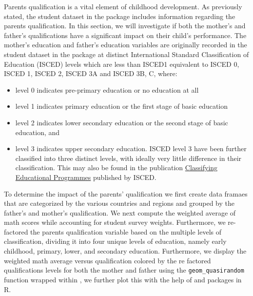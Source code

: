 Parents qualification is a vital element of childhood development. As previously stated, the student dataset in the package includes information regarding the parents qualification. In this section, we will investigate if both the mother's and father's qualifications have a significant impact on their child's performance. The mother's education and father's education variables are originally recorded in the student dataset in the  package at distinct International Standard Classification of Education (ISCED) levels which are less than ISCED1 equivalent to ISCED 0, ISCED 1, ISCED 2, ISCED 3A and ISCED 3B, C, where:

\begin{itemize}
\tightlist
\item
  level 0 indicates pre-primary education or no education at all
\item
  level 1 indicates primary education or the first stage of basic education
\item
  level 2 indicates lower secondary education or the second stage of basic education, and
\item
  level 3 indicates upper secondary education. ISCED level 3 have been further classified into three distinct levels, with ideally very little difference in their classification. This may also be found in the publication \href{https://www.oecd.org/education/1841854.pdf}{Classifying Educational Programmes} \citep{isced} published by ISCED.
\end{itemize}

To determine the impact of the parents' qualification we first create data framaes that are categorized by the various countries and regions and grouped by the father's and mother's qualification. We next compute the weighted average of math scores while accounting for student survey weights. Furthermore, we re-factored the parents qualification variable based on the multiple levels of classification, dividing it into four unique levels of education, namely early childhood, primary, lower, and secondary education. Furthermore, we display the weighted math average versus qualification colored by the re factored qualifications levels for both the mother and father using the \texttt{geom\_quasirandom} function wrapped within  \citep{ggplot2}, we further plot this with the help of  \citep{viridis} and  \citep{patchwork} packages in R.

